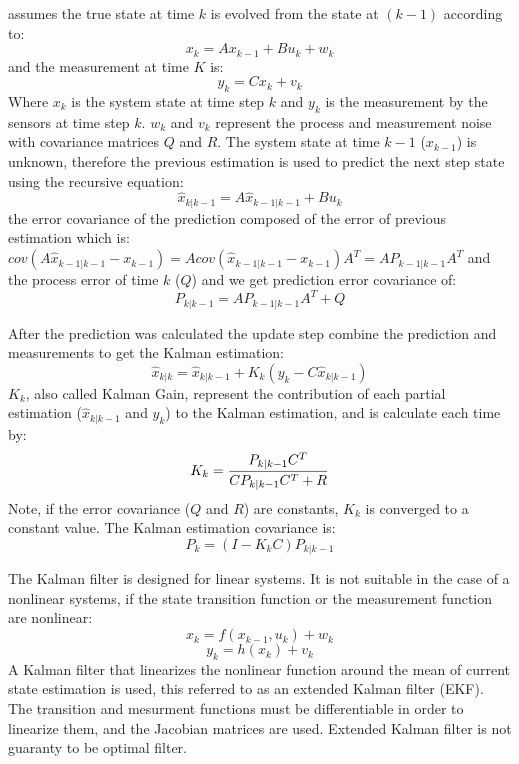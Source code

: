 \documentclass[ twoside, 12pt ]{article}
\begin{document}
assumes the true state at time $k$ is evolved from the state at $(k-1)$ according to:
$$x_{k}=Ax_{k-1} + Bu_{k} + w_{k}$$
and the measurement at time $K$ is:
$$y_k=Cx_k+v_k$$
Where $x_k$ is the system state at time step $k$ and $y_k$ is the measurement by the sensors at time step $k$.
$w_k$ and $v_k$ represent the process and measurement noise with covariance matrices $Q$ and $R$.
The system state at time $k-1$ ($x_{k-1}$) is unknown, therefore the previous estimation is used to predict the next step state using the recursive equation:
$$ \hat{x}_{k|k-1}=A\hat{x}_{k-1|k-1} + Bu_{k} $$
the error covariance of the prediction composed of the error of previous estimation which is:
$cov(A\hat{x}_{k-1|k-1} - x_{k-1}) = A cov(\hat{x}_{k-1|k-1} - x_{k-1}) A^T=A P_{k-1|k-1} A^T$
and the process error of time $k$ ($Q$) and we get prediction error covariance of:
$$ P_{k|k-1} = A P_{k-1|k-1} A^T + Q $$

After the prediction was calculated the update step combine the prediction and measurements to get the Kalman estimation:
$$ \hat{x}_{k|k} = \hat{x}_{k|k-1} + K_k(y_k - C\hat{x}_{k|k-1})$$
$K_k$, also called Kalman Gain, represent the contribution of each partial estimation ($\hat{x}_{k|k-1}$ and $y_k$) to the Kalman estimation, and is calculate each time by:
$$ K_k = {{P_{k|k-1} C^T} \over {C P_{k|k-1} C^T + R} }$$
Note, if the error covariance ($Q$ and $R$) are constants, $K_k$ is converged to a constant value.
The Kalman estimation covariance is:
$$ P_k = (I - K_kC) P_{k|k-1} $$

The Kalman filter is designed for linear systems. It is not suitable in the case of a nonlinear systems, if the state transition function or the measurement function are nonlinear:
$$x_{k}=f(x_{k-1} , u_{k}) + w_{k}$$
$$y_k=h(x_k) + v_k$$
A Kalman filter that linearizes the nonlinear function around the mean of current state estimation is used, this referred to as an extended Kalman filter (EKF).
The transition and mesurment functions must be differentiable in order to linearize them, and the Jacobian matrices are used.
Extended Kalman filter is not guaranty to be optimal filter.

\end{document}
